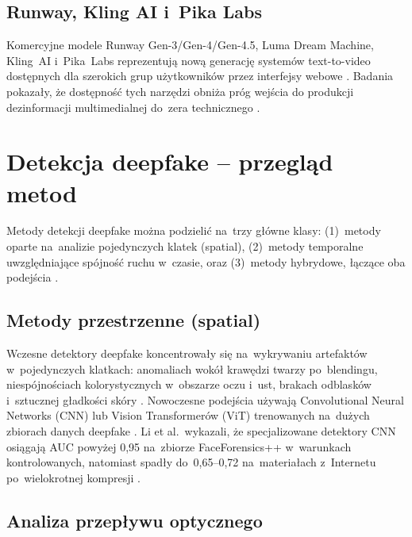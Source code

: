 \subsection{Runway, Kling AI i~Pika Labs}

Komercyjne modele Runway Gen-3/Gen-4/Gen-4.5, Luma Dream Machine, Kling~AI
i~Pika~Labs reprezentuj\k{a} now\k{a} generacj\k{e} system\'{o}w text-to-video
dost\k{e}pnych dla szerokich grup u\.{z}ytkownik\'{o}w przez interfejsy webowe
\cite{Runway2024Gen3}.
Badania pokaza\l{}y, \.{z}e dost\k{e}pno\'{s}\'{c} tych narz\k{e}dzi obni\.{z}a pr\'{o}g
wej\'{s}cia do produkcji dezinformacji multimedialnej do~zera technicznego
\cite{Li2025AIGCSurvey}.

\section{Detekcja deepfake -- przegl\k{a}d metod}
\label{sec:detekcja_przeglad}

Metody detekcji deepfake mo\.{z}na podzieli\'{c} na~trzy g\l{}\'{o}wne klasy:
(1)~metody oparte na~analizie pojedynczych klatek (spatial),
(2)~metody temporalne uwzgl\k{e}dniaj\k{a}ce sp\'{o}jno\'{s}\'{c} ruchu w~czasie,
oraz (3)~metody hybrydowe, \l{}\k{a}cz\k{a}ce oba podej\'{s}cia
\cite{Wang2024ReliabilityPerspective}.

\subsection{Metody przestrzenne (spatial)}

Wczesne detektory deepfake koncentrowa\l{}y si\k{e} na~wykrywaniu
artefakt\'{o}w w~pojedynczych klatkach: anomaliach wok\'{o}\l{}
kraw\k{e}dzi twarzy po~blendingu, niesp\'{o}jno\'{s}ciach kolorystycznych
w~obszarze oczu i~ust, brakach odblask\'{o}w i~sztucznej g\l{}adko\'{s}ci
skóry \cite{Matern2019ExploitingVisualArtifacts}.
Nowoczesne podej\'{s}cia u\.{z}ywaj\k{a} Convolutional Neural Networks (CNN)
lub Vision Transformer\'{o}w (ViT) trenowanych na~du\.{z}ych zbiorach
danych deepfake \cite{Dong2023CLIPDeepfake}.
Li et al.\ wykazali, \.{z}e specjalizowane detektory CNN osi\k{a}gaj\k{a} AUC
powy\.{z}ej 0,95 na~zbiorze FaceForensics++ w~warunkach kontrolowanych,
natomiast spad\l{}y do~0,65--0,72 na~materia\l{}ach z~Internetu
po~wielokrotnej kompresji \cite{Li2025AIGCSurvey}.

\subsection{Analiza przep\l{}ywu optycznego}

